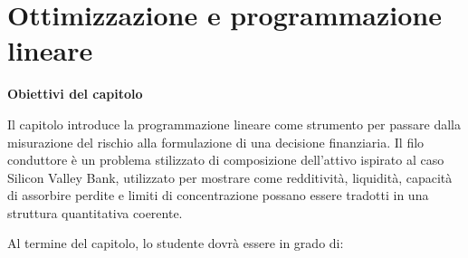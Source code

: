 
\chapter
{Ottimizzazione e programmazione lineare}

\label{cap:programmazione-lineare}

\medskip

\noindent
\textbf{Obiettivi del capitolo}

Il capitolo introduce la programmazione lineare come strumento per passare
dalla misurazione del rischio alla formulazione di una decisione finanziaria.
Il filo conduttore \`e un problema stilizzato di composizione dell'attivo
ispirato al caso Silicon Valley Bank, utilizzato per mostrare come
redditivit\`a, liquidit\`a, capacit\`a di assorbire perdite e limiti di
concentrazione possano essere tradotti in una struttura quantitativa
coerente.

Al termine del capitolo, lo studente dovr\`a essere in grado di:

